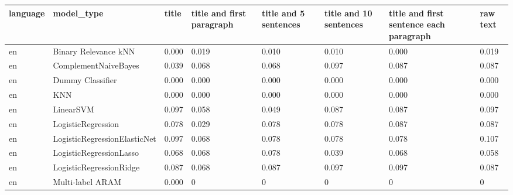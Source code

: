 \begin{tabular}{llllllll}
\toprule
language &                      model\_type &     title & title and first paragraph & title and 5 sentences & title and 10 sentences & title and first sentence each paragraph &  raw text \\
\midrule
      en &            Binary Relevance kNN &     0.000 &                     0.019 &                 0.010 &                  0.010 &                                   0.000 &     0.019 \\
      en &            ComplementNaiveBayes &     0.039 &                     0.068 &                 0.068 &                  0.097 &                                   0.087 &     0.087 \\
      en &                Dummy Classifier &     0.000 &                     0.000 &                 0.000 &                  0.000 &                                   0.000 &     0.000 \\
      en &                             KNN &     0.000 &                     0.000 &                 0.000 &                  0.000 &                                   0.000 &     0.000 \\
      en &                       LinearSVM &     0.097 &                     0.058 &                 0.049 &                  0.087 &                                   0.087 &     0.097 \\
      en &              LogisticRegression &     0.078 &                     0.029 &                 0.078 &                  0.078 &                                   0.087 &     0.087 \\
      en &    LogisticRegressionElasticNet &     0.097 &                     0.068 &                 0.078 &                  0.078 &                                   0.078 &     0.107 \\
      en &         LogisticRegressionLasso &     0.068 &                     0.068 &                 0.078 &                  0.039 &                                   0.068 &     0.058 \\
      en &         LogisticRegressionRidge &     0.087 &                     0.068 &                 0.087 &                  0.097 &                                   0.097 &     0.087 \\
      en &                Multi-label ARAM &     0.000 &                         0 &                     0 &                      0 &                                       0 &         0 \\

\end{tabular}

